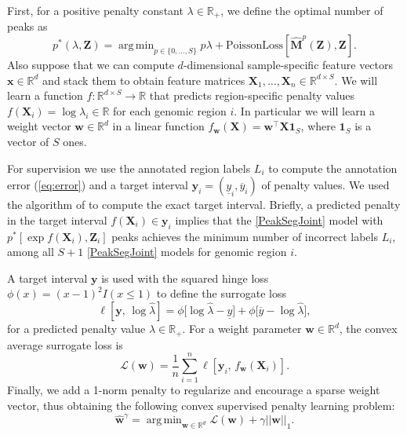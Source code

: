\documentclass{article} %
\DeclareMathOperator*{\argmin}{arg\,min}
\newcommand{\RR}{\mathbb R}
\begin{document}
First, for a positive penalty constant $\lambda\in\RR_+$, we define
the optimal number of peaks as
\begin{equation}
  \label{eq:optimal_segments}
  p^*(\lambda, \mathbf Z) =
  \argmin_{p\in\{0, \dots, S\}}
  p \lambda + 
  \text{PoissonLoss}\left[
    \mathbf{\hat M}^p(\mathbf Z),
    \mathbf Z
  \right].
\end{equation}
Also suppose that we can compute $d$-dimensional sample-specific
feature vectors $\mathbf x\in\RR^d$ and stack them to obtain feature
matrices $\mathbf X_1,\dots, \mathbf X_n\in\RR^{d\times S}$. We will
learn a function $f:\RR^{d\times S}\rightarrow\RR$ that predicts
region-specific penalty values $f(\mathbf X_i) = \log \lambda_i\in\RR$
for each genomic region $i$. In particular we will learn a weight
vector $\mathbf w\in\RR^d$ in a linear function $f_{\mathbf w}(\mathbf X) =
\mathbf w^\intercal \mathbf X \mathbf 1_S$, where $\mathbf 1_S$ is a
vector of $S$ ones.

For supervision we use the annotated region labels $L_i$ to compute
the annotation error (\ref{eq:error}) and a target interval $\mathbf
y_i = (
    \underline y_i, \overline y_i
)$ of penalty values. We used the algorithm of
\citet{HOCKING-penalties} to compute the exact target interval.
Briefly,
a predicted penalty in the target interval $f(\mathbf
X_i)\in\mathbf y_i$ implies that the
\ref{PeakSegJoint} model with $p^*\left[\exp f(\mathbf X_i), \mathbf
  Z_i\right]$ peaks achieves the minimum number of incorrect labels
$L_i$, among all $S+1$ \ref{PeakSegJoint} models for genomic region $i$.

A target interval $\mathbf y$ is used with the squared hinge loss
$\phi(x)=(x-1)^2 I(x\leq 1)$ to define the surrogate loss
\begin{equation}
  \label{eq:surrogate_loss}
  \ell\left[
    \mathbf y,\,
    \log \hat \lambda
    \right]
    =
    \phi\big[
      \log\hat\lambda - \underline y
    \big]
    +
    \phi\big[
    \overline y - \log\hat\lambda
    \big],
\end{equation}
for a predicted penalty value $\hat \lambda\in\RR_+$. For a weight parameter
$\mathbf w\in\RR^d$, the convex average surrogate loss is
\begin{equation}
  \label{eq:average_surrogate}
  \mathcal L(\mathbf w) =
  \frac 1 n
  \sum_{i=1}^n
  \ell\left[
    \mathbf y_i,\,
     f_{\mathbf w}( \mathbf X_i )
    \right].
\end{equation}
Finally, we add a 1-norm penalty to regularize and encourage a sparse
weight vector, thus obtaining the following convex supervised penalty
learning problem:
\begin{equation}
  \label{argmin_w}
  \mathbf{\hat w}^\gamma = 
  \argmin_{\mathbf w\in\RR^d}
  \mathcal L(\mathbf w) + \gamma ||\mathbf w||_1.
\end{equation}
\end{document}
